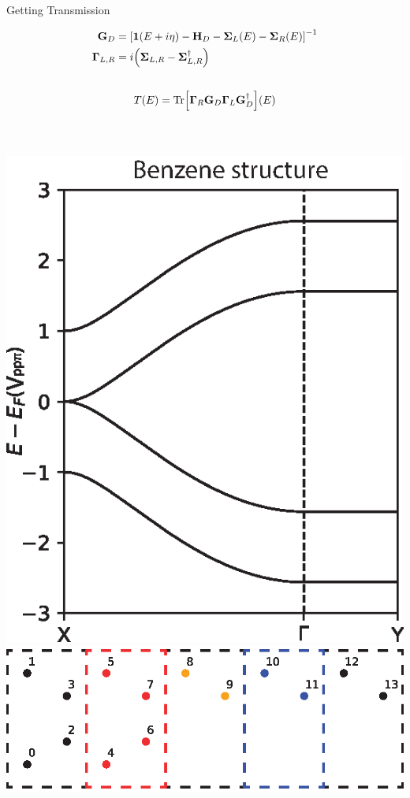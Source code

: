 \documentclass[hyperref={colorlinks=true,urlcolor=blue,linkcolor=.},aspectratio=1610,mathserif]{beamer}
\newcommand{\im}[3]{\inputminted[linenos=true, python3=true, firstline=#2, lastline=#3]{python}{#1}}
\begin{document}
\begin{frame}{Getting Transmission}
	\centering
	\begin{overprint}
		\begin{align*}
			\vb{G}_D          & = \bqty{\vb{1}\pqty{E+i\eta}-\vb{H}_D - \vb{\Sigma}_L(E)-\vb{\Sigma}_R(E)}^{-1} \\
			\vb{\Gamma}_{L,R} & = i\pqty{\vb{\Sigma}_{L,R} - \vb{\Sigma}_{L,R}^{\dagger}}
		\end{align*}
		\im{Listings/Functions.py}{225}{228}
		\begin{align*}
			T(E) = \mathrm{Tr}\bqty{\vb{\Gamma}_R\vb{G}_D\vb{\Gamma}_L\vb{G}_D^{\dagger}}(E)
		\end{align*}
		\begin{columns}[c]
			\im{Listings/Functions.py}{240}{243}
		\end{columns}
		\vspace{-.5cm}
		\begin{columns}[c]
			\includegraphics[width=.75\textwidth]{Figures/Beta1.eps}
			\includegraphics[width=.8\textwidth]{Figures/BetaStruct.eps}

\end{columns}
\end{overprint}
\end{frame}
\end{document}
